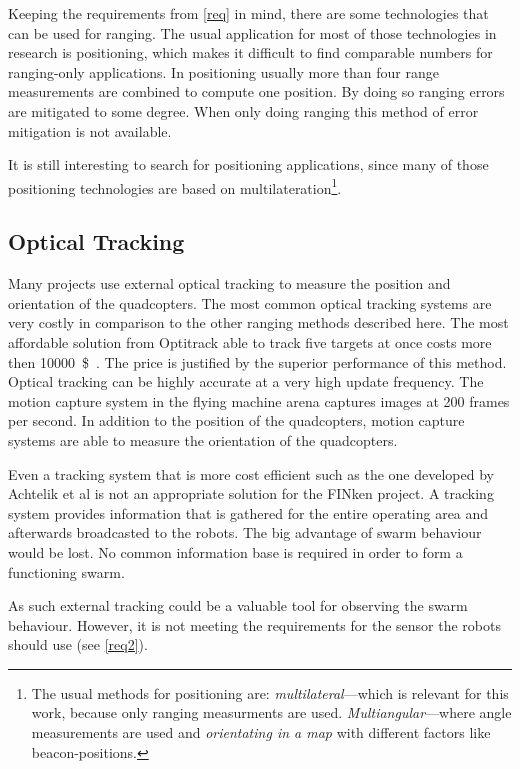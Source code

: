 Keeping the requirements from \autoref{req} in mind, there are some technologies that can be used for ranging.
The usual application for most of those technologies in research is positioning, which makes it difficult to find comparable numbers for ranging-only applications.
In positioning usually more than four range measurements are combined to compute one position.
By doing so ranging errors are mitigated to some degree.
When only doing ranging this method of error mitigation is not available.

It is still interesting to search for positioning applications, since many of those positioning technologies are based on multilateration\footnote{
The usual methods for positioning are: \emph{multilateral}—which is relevant for this work, because only ranging measurments are used. \emph{Multiangular}—where angle measurements are used and \emph{orientating in a map} with different factors like beacon-positions.}.
\cite{_multilateration_2015}

\subsection{Optical Tracking}
Many projects use external optical tracking to measure the position and orientation of the quadcopters.
The most common optical tracking systems are very costly in comparison to the other ranging methods described here.
The most affordable solution from Optitrack able to track five targets at once costs more then \SI{10000}{\$}~\cite{optitrack.com}.
The price is justified by the superior performance of this method.
Optical tracking can be highly accurate at a very high update frequency. 
The motion capture system in the flying machine arena \cite{flyingmachinearena} captures images at 200 frames per second.
In addition to the position of the quadcopters, motion capture systems are able to measure the orientation of the quadcopters.


Even a tracking system that is more cost efficient such as the one developed by Achtelik et al\cite{Achtelik2009} is not an appropriate solution for the FINken project.
A tracking system provides information that is gathered for the entire operating area and afterwards broadcasted to the robots.
The big advantage of swarm behaviour would be lost.
No common information base is required in order to form a functioning swarm.

As such external tracking could be a valuable tool for observing the swarm behaviour.
However, it is not meeting the requirements for the sensor the robots should use (see \autoref{req2}).

